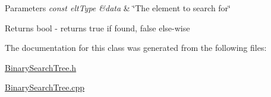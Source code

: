 \begin{DoxyParams}{Parameters}
{\em const elt\-Type \&data} & \char`\"{}\-The element to search for\char`\"{} \\
\hline
\end{DoxyParams}
\begin{DoxyReturn}{Returns}
bool -\/ returns true if found, false else-\/wise 
\end{DoxyReturn}


The documentation for this class was generated from the following files\-:\begin{DoxyCompactItemize}
\item 
\hyperlink{BinarySearchTree_8h}{Binary\-Search\-Tree.\-h}\item 
\hyperlink{BinarySearchTree_8cpp}{Binary\-Search\-Tree.\-cpp}\end{DoxyCompactItemize}
